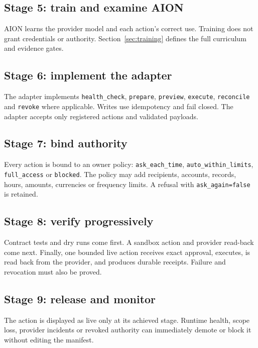 \documentclass[11pt,a4paper]{article}
\newcommand{\code}[1]{\texttt{#1}}
\begin{document}
\subsection{Stage 5: train and examine AION}

AION learns the provider model and each action's correct use. Training does not
grant credentials or authority. Section~\ref{sec:training} defines the full
curriculum and evidence gates.

\subsection{Stage 6: implement the adapter}

The adapter implements \code{health\_check}, \code{prepare}, \code{preview},
\code{execute}, \code{reconcile} and \code{revoke} where applicable. Writes use
idempotency and fail closed. The adapter accepts only registered actions and
validated payloads.

\subsection{Stage 7: bind authority}

Every action is bound to an owner policy: \code{ask\_each\_time},
\code{auto\_within\_limits}, \code{full\_access} or \code{blocked}. The policy
may add recipients, accounts, records, hours, amounts, currencies or frequency
limits. A refusal with \code{ask\_again=false} is retained.

\subsection{Stage 8: verify progressively}

Contract tests and dry runs come first. A sandbox action and provider read-back
come next. Finally, one bounded live action receives exact approval, executes,
is read back from the provider, and produces durable receipts. Failure and
revocation must also be proved.

\subsection{Stage 9: release and monitor}

The action is displayed as live only at its achieved stage. Runtime health,
scope loss, provider incidents or revoked authority can immediately demote or
block it without editing the manifest.
\end{document}
